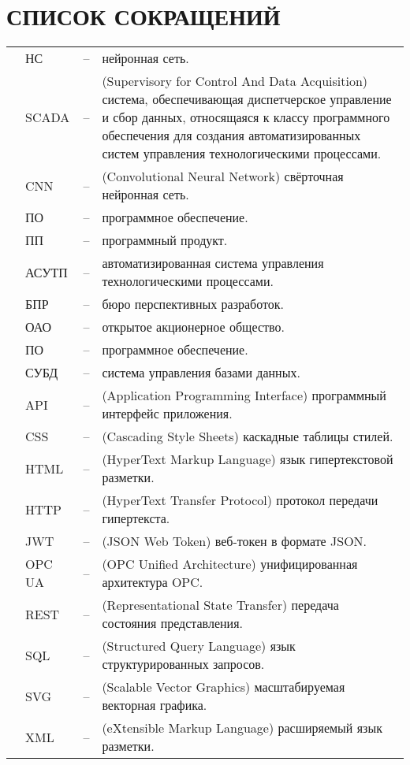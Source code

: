 \sectionbreak \section*{ 
    \gostTitleFont
    \redline
    СПИСОК СОКРАЩЕНИЙ
}
\titlespace

{\gostFont

\begin{tabular}{p{0.85cm} p{1.75cm} p{0.3cm} p{131.5mm}}
    & НС & {--} & нейронная сеть. \\
    & SCADA & {--} & (Supervisory for Control And Data Acquisition) система, обеспечивающая диспетчерское управление и сбор данных, относящаяся к классу программного обеспечения для создания автоматизированных систем управления технологическими процессами. \\
    & CNN & {--} & (Convolutional Neural Network) свёрточная нейронная сеть. \\
    & ПО & {--} & программное обеспечение. \\
    & ПП & {--} & программный продукт. \\
    & АСУТП & {--} & автоматизированная система управления технологическими процессами. \\
    & БПР & {--} & бюро перспективных разработок. \\
    & ОАО & {--} & открытое акционерное общество. \\
    & ПО & {--} & программное обеспечение. \\
    & СУБД & {--} & система управления базами данных. \\
    & API & {--} & (Application Programming Interface) программный интерфейс приложения. \\
    & CSS & {--} & (Cascading Style Sheets) каскадные таблицы стилей. \\
    & HTML & {--} & (HyperText Markup Language) язык гипертекстовой разметки. \\
    & HTTP & {--} & (HyperText Transfer Protocol) протокол передачи гипертекста. \\
    & JWT & {--} & (JSON Web Token) веб-токен в формате JSON. \\
    & OPC UA & {--} & (OPC Unified Architecture) унифицированная архитектура OPC. \\
    & REST & {--} & (Representational State Transfer) передача состояния представления. \\
    & SQL & {--} & (Structured Query Language) язык структурированных запросов. \\
    & SVG & {--} & (Scalable Vector Graphics) масштабируемая векторная графика. \\
    & XML & {--} & (eXtensible Markup Language) расширяемый язык разметки. \\
\end{tabular}

}
